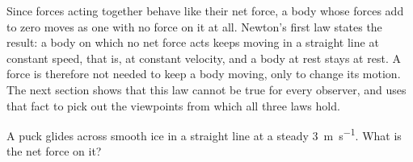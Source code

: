 Since forces acting together behave like their net force, a body whose
forces add to zero moves as one with no force on it at all. Newton's
first law states the result: a body on which no net force acts keeps moving in a straight line at constant
speed, that is, at constant velocity, and a body at rest stays at rest. A
force is therefore not needed to keep a body moving, only to change its
motion. The next section shows that this law cannot be true for every
observer, and uses that fact to pick out the viewpoints from which all
three laws hold.

\begin{selfcheck}
A puck glides across smooth ice in a straight line at a steady
\SI{3}{\metre\per\second}. What is the net force on it?
\end{selfcheck}
